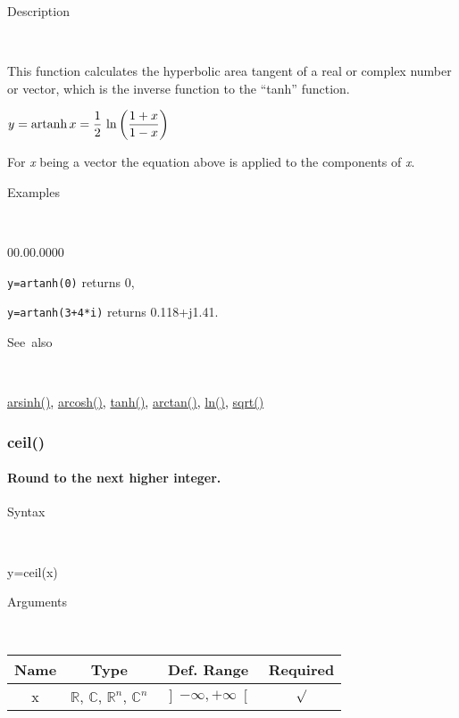 \begin{description}
\item [Description]~
\end{description}
This function calculates the hyperbolic area tangent of a real or
complex number or vector, which is the inverse function to the {}``tanh''
function.

\medskip{}
$y=\textrm{artanh\,}x={\displaystyle \frac{1}{2}\,\ln\left(\frac{1+x}{1-x}\right)}$ 
\medskip{}

\noindent For \textit{x} being a vector the equation above is applied
to the components of \textit{x}.

\begin{description}
\item [Examples]~
\end{description}
\begin{lyxlist}{00.00.0000}
\item [\texttt{y=artanh(0)}]returns 0,
\item [\texttt{y=artanh(3+4{*}i)}]returns 0.118+j1.41.
\end{lyxlist}
\begin{description}
\item [See~also]~
\end{description}
\textcolor{blue}{\hyperlink{arsinh}{arsinh()}}\textcolor{black}{,}
\textcolor{blue}{\hyperlink{arcosh}{arcosh()}}\textcolor{black}{,}
\textcolor{blue}{\hyperlink{tanh}{tanh()}}\textcolor{black}{,} \textcolor{blue}{\hyperlink{arctan}{arctan()}}\textcolor{black}{,}
\textcolor{blue}{\hyperlink{ln}{ln()}}\textcolor{black}{,} \textcolor{blue}{\hyperlink{sqrt}{sqrt()}}


\newpage
{}


\subsubsection*{\hypertarget{ceil}{}{\Large ceil()}}


\paragraph{\label{par:ceil}Round to the next higher integer.}

\begin{description}
\item [Syntax]~
\end{description}
y=ceil(x)

\begin{description}
\item [Arguments]~
\end{description}
\begin{tabular}{|c|c|c|c|}
\hline 
Name&
Type&
Def. Range&
Required\tabularnewline
\hline
\hline 
x&
$\mathbb{R}$, $\mathbb{C}$, $\mathbb{R}^{n}$, $\mathbb{C}^{n}$&
$\left]-\infty,+\infty\right[$&
$\surd$\tabularnewline
\hline
\end{tabular}

